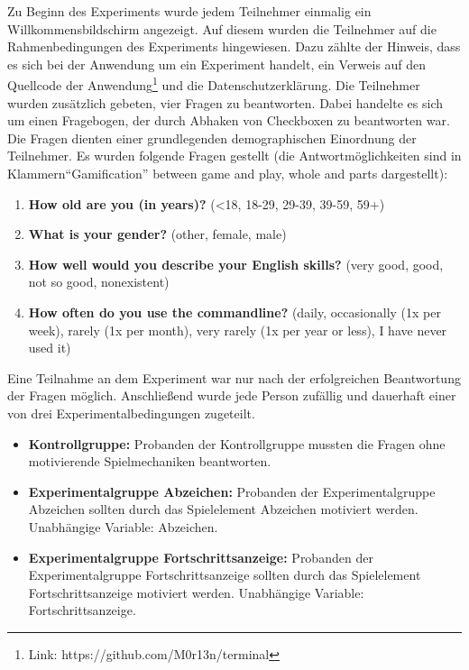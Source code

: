Zu Beginn des Experiments wurde jedem Teilnehmer einmalig ein Willkommensbildschirm angezeigt. Auf diesem wurden die Teilnehmer auf die Rahmenbedingungen des Experiments hingewiesen. Dazu zählte der Hinweis, dass es sich bei der Anwendung um ein Experiment handelt, ein Verweis auf den Quellcode der Anwendung\footnote{Link: https://github.com/M0r13n/terminal} und die Datenschutzerklärung. Die Teilnehmer wurden zusätzlich gebeten, vier Fragen zu beantworten. Dabei handelte es sich um einen Fragebogen, der durch Abhaken von Checkboxen zu beantworten war. Die Fragen dienten einer grundlegenden demographischen Einordnung der Teilnehmer. Es wurden folgende Fragen gestellt (die Antwortmöglichkeiten sind in Klammern“Gamification” between game and play, whole and parts dargestellt):

\begin{enumerate}\label{demography}
	 \item \textbf{How old are you (in years)?} (<18, 18-29, 29-39, 39-59, 59+)
     \item \textbf{What is your gender?} (other, female, male)
     \item \textbf{How well would you describe your English skills?} (very good, good, not so good, nonexistent)
     \item \textbf{How often do you use the commandline?} (daily, occasionally (1x per week), rarely (1x per month), very rarely (1x per year or less), I have never used it)
\end{enumerate}

Eine Teilnahme an dem Experiment war nur nach der erfolgreichen Beantwortung der Fragen möglich. Anschließend wurde jede Person zufällig und dauerhaft einer von drei Experimentalbedingungen  zugeteilt.


\begin{itemize}
	 \item \textbf{Kontrollgruppe:} Probanden der Kontrollgruppe mussten die Fragen ohne motivierende Spielmechaniken beantworten.
	 
    \item \textbf{Experimentalgruppe Abzeichen:} Probanden der Experimentalgruppe Abzeichen sollten durch das Spielelement Abzeichen motiviert werden. Unabhängige Variable: Abzeichen.

    \item \textbf{Experimentalgruppe Fortschrittsanzeige:} Probanden der Experimentalgruppe Fortschrittsanzeige sollten durch das Spielelement Fortschrittsanzeige motiviert werden. Unabhängige Variable: Fortschrittsanzeige.
\end{itemize}

